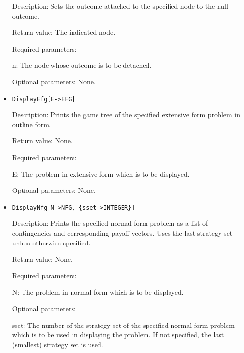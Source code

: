 \begin{itemize}
\bd
\item
[Description:] Sets the outcome attached to the specified node to the
null outcome.
\item   
[Return value:] The indicated node.
\item
[Required parameters:]\hfil\null

\bd
\item	
[n:] The node whose outcome is to be detached.
\ed

\item
[Optional parameters:] None.
\ed

\item
\protect \large \begin{verbatim}
DisplayEfg[E->EFG]
\end{verbatim}\normalsize

\bd
\item
[Description:] Prints the game tree of the specified extensive form
problem in outline form.
\item
[Return value:] None.
\item
[Required parameters:]\hfil\null

\bd
\item
[E:] The problem in extensive form which is to be displayed.
\ed

\item
[Optional parameters:] None.
\ed

\item
\protect \large \begin{verbatim}
DisplayNfg[N->NFG, {sset->INTEGER}]
\end{verbatim}\normalsize

\bd
\item
[Description:] Prints the specified normal form problem as a list of
contingencies and corresponding payoff vectors.  Uses the last
strategy set unless otherwise specified.
\item
[Return value:] None.
\item
[Required parameters:]\hfil\null

\bd	
\item
[N:] The problem in normal form which is to be displayed.
\ed

\item
[Optional parameters:]\hfil\null

\bd
\item
[sset:] The number of the strategy set of the specified normal form
problem which is to be used in displaying the problem.  If not
specified, the last (smallest) strategy set is used.
\ed
\ed


\end{itemize}
